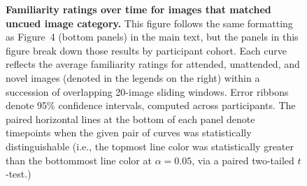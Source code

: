 \documentclass{article}
\def\rot#1{\raisebox{-1.35in}{\rotatebox{90}{#1}}}
\begin{document}


\begin{figure}[ht]
\captionsetup[subfigure]{labelformat=empty}
\rot{\rlap{\textbf{Sustained}}}
 \hfill
 \hfill

\raisebox{.05in}{\rot{\rlap{\textbf{Variable}}}}
 \hfill
 \hfill

  \caption{\textbf{Familiarity ratings over time for images that matched uncued image category.}  This figure follows the same formatting as
  Figure~4 (bottom panels) in the main text, but the panels in this figure break down
  those results by participant cohort.  Each curve reflects the average familiarity ratings for attended, unattended, and novel images (denoted in the legends on the right) within a succession of overlapping 20-image sliding windows.  Error ribbons denote 95\% confidence intervals, computed across participants. The paired horizontal lines at the bottom of each panel denote timepoints when the given pair of curves was statistically distinguishable (i.e., the topmost line color was statistically greater than the bottommost line color at $\alpha = 0.05$, via a paired two-tailed $t$-test.)}
  \label{fig:familiarity_timecourse_category4}
\end{figure}
\end{document}

